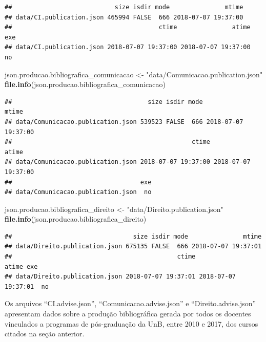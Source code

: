 \documentclass[]{article}
\newenvironment{Shaded}{\begin{snugshade}}{\end{snugshade}}
\newcommand{\KeywordTok}[1]{\textcolor[rgb]{0.13,0.29,0.53}{\textbf{#1}}}
\newcommand{\StringTok}[1]{\textcolor[rgb]{0.31,0.60,0.02}{#1}}
\newcommand{\NormalTok}[1]{#1}
\begin{document}
\begin{verbatim}
##                            size isdir mode               mtime
## data/CI.publication.json 465994 FALSE  666 2018-07-07 19:37:00
##                                        ctime               atime exe
## data/CI.publication.json 2018-07-07 19:37:00 2018-07-07 19:37:00  no
\end{verbatim}

\begin{Shaded}
\begin{Highlighting}[]
\NormalTok{json.producao.bibliografica_comunicacao <-}\StringTok{ "data/Comunicacao.publication.json"}
\KeywordTok{file.info}\NormalTok{(json.producao.bibliografica_comunicacao) }
\end{Highlighting}
\end{Shaded}

\begin{verbatim}
##                                     size isdir mode               mtime
## data/Comunicacao.publication.json 539523 FALSE  666 2018-07-07 19:37:00
##                                                 ctime               atime
## data/Comunicacao.publication.json 2018-07-07 19:37:00 2018-07-07 19:37:00
##                                   exe
## data/Comunicacao.publication.json  no
\end{verbatim}

\begin{Shaded}
\begin{Highlighting}[]
\NormalTok{json.producao.bibliografica_direito <-}\StringTok{ "data/Direito.publication.json"}
\KeywordTok{file.info}\NormalTok{(json.producao.bibliografica_direito) }
\end{Highlighting}
\end{Shaded}

\begin{verbatim}
##                                 size isdir mode               mtime
## data/Direito.publication.json 675135 FALSE  666 2018-07-07 19:37:01
##                                             ctime               atime exe
## data/Direito.publication.json 2018-07-07 19:37:01 2018-07-07 19:37:01  no
\end{verbatim}

Os arquivos ``CI.advise.json'', ``Comunicacao.advise.json'' e
``Direito.advise.json'' apresentam dados sobre a produção bibliográfica
gerada por todos os docentes vinculados a programas de pós-graduação da
UnB, entre 2010 e 2017, dos cursos citados na seção anterior.
\end{document}
